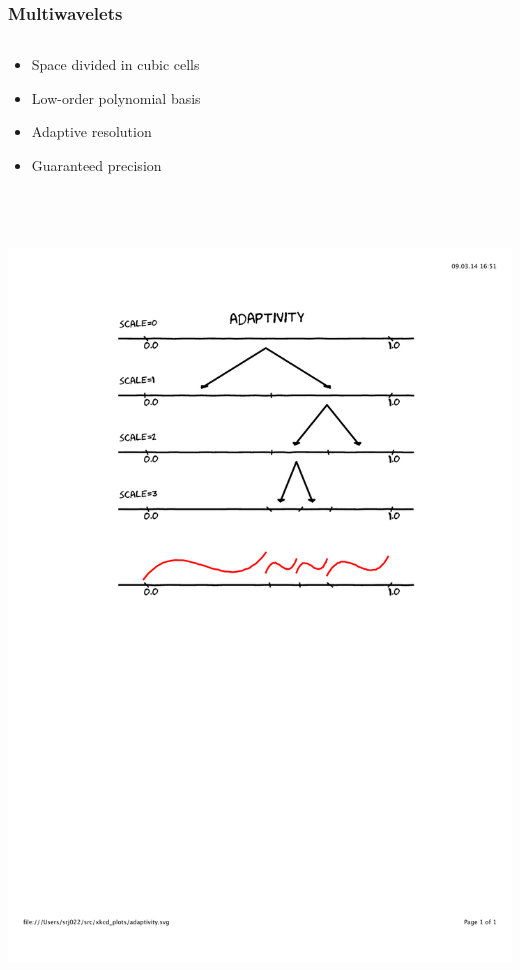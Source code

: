 \documentclass[mathserif, 10pt]{beamer}
\begin{document}
\begin{frame}
    \frametitle{Multiwavelets}
    \begin{columns}
    \begin{column}[b]{0.4\linewidth}
	\begin{itemize}
	   \item Space divided in cubic cells
	    \item Low-order polynomial basis
	    \item Adaptive resolution
	    \item Guaranteed precision
	\end{itemize}
	\ \\
	\ \\
	\ \\
	\centering
	\includegraphics[scale=0.3, clip, viewport = 100 400 500 800]{figures/adaptivity.pdf}
    \end{column}

\end{columns}
\end{frame}
\end{document}
